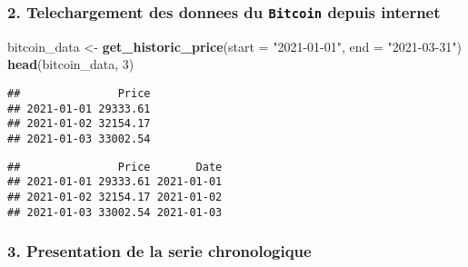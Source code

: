 \documentclass[
]{article}
\newenvironment{Shaded}{\begin{snugshade}}{\end{snugshade}}
\newcommand{\AttributeTok}[1]{\textcolor[rgb]{0.13,0.29,0.53}{#1}}
\newcommand{\DecValTok}[1]{\textcolor[rgb]{0.00,0.00,0.81}{#1}}
\newcommand{\FunctionTok}[1]{\textcolor[rgb]{0.13,0.29,0.53}{\textbf{#1}}}
\newcommand{\NormalTok}[1]{#1}
\newcommand{\OtherTok}[1]{\textcolor[rgb]{0.56,0.35,0.01}{#1}}
\newcommand{\SpecialCharTok}[1]{\textcolor[rgb]{0.81,0.36,0.00}{\textbf{#1}}}
\newcommand{\StringTok}[1]{\textcolor[rgb]{0.31,0.60,0.02}{#1}}
\begin{document}
\subsubsection{\texorpdfstring{2. Telechargement des donnees du
\texttt{Bitcoin} depuis
internet}{2. Telechargement des donnees du Bitcoin depuis internet}}\label{telechargement-des-donnees-du-bitcoin-depuis-internet}

\begin{Shaded}
\begin{Highlighting}[]
\NormalTok{bitcoin\_data }\OtherTok{\textless{}{-}} \FunctionTok{get\_historic\_price}\NormalTok{(}\AttributeTok{start =} \StringTok{"2021{-}01{-}01"}\NormalTok{, }\AttributeTok{end =} \StringTok{"2021{-}03{-}31"}\NormalTok{)}
\FunctionTok{head}\NormalTok{(bitcoin\_data, }\DecValTok{3}\NormalTok{)}
\end{Highlighting}
\end{Shaded}

\begin{verbatim}
##               Price
## 2021-01-01 29333.61
## 2021-01-02 32154.17
## 2021-01-03 33002.54
\end{verbatim}

\begin{Shaded}
\end{Shaded}

\begin{verbatim}
##               Price       Date
## 2021-01-01 29333.61 2021-01-01
## 2021-01-02 32154.17 2021-01-02
## 2021-01-03 33002.54 2021-01-03
\end{verbatim}

\subsubsection{3. Presentation de la serie
chronologique}\label{presentation-de-la-serie-chronologique}

\begin{Shaded}
\end{Shaded}
\end{document}
